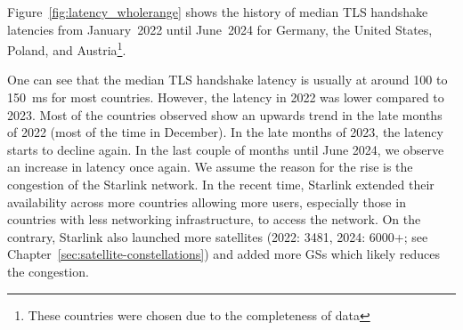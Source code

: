 Figure~\ref{fig:latency_wholerange} shows the history of median TLS handshake
latencies from January~2022 until June~2024 for Germany, the United States,
Poland, and Austria\footnote{These countries were chosen due to the
	completeness of data}.

One can see that the median TLS handshake latency is usually at around 100 to
150~ms for most countries. However, the latency in 2022 was lower compared to
2023. Most of the countries observed show an upwards trend in the late months
of 2022 (most of the time in December). In the late months of 2023, the latency
starts to decline again. In the last couple of months until June 2024, we
observe an increase in latency once again. We assume the reason for the rise is
the congestion of the Starlink network. In the recent time, Starlink extended
their availability across more countries allowing more users, especially those
in countries with less networking infrastructure, to access the network. On the
contrary, Starlink also launched more satellites (2022: 3481, 2024: 6000+; see
Chapter~\ref{sec:satellite-constellations}) and added more \ac{GS}s which
likely reduces the congestion.

